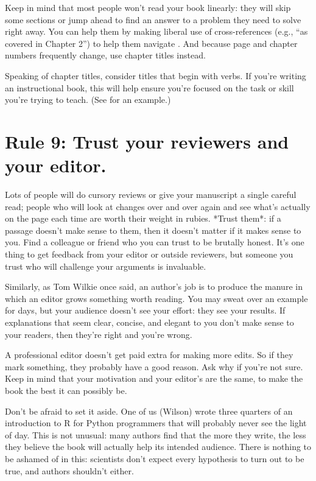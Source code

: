 \documentclass[10pt,letterpaper]{article}
\begin{document}
Keep in mind that most people won't read your book linearly:
they will skip some sections or jump ahead to find an answer to a problem they need to solve right away.
You can help them by making liberal use of cross-references
(e.g., ``as covered in Chapter 2'') to help them navigate \cite{Li2020}.
And because page and chapter numbers frequently change, use chapter titles instead.

Speaking of chapter titles, consider titles that begin with verbs.
If you're writing an instructional book,
this will help ensure you're focused on the task or skill you're trying to teach.
(See \cite{Me2022} for an example.)

\section*{Rule 9: Trust your reviewers and your editor. }

Lots of people will do cursory reviews
or give your manuscript a single careful read;
people who will look at changes over and over again
and see what's actually on the page each time
are worth their weight in rubies.
*Trust them*:
if a passage doesn't make sense to them,
then it doesn't matter if it makes sense to you.
Find a colleague or friend who you can trust to be brutally honest.
It's one thing to get feedback from your editor or outside reviewers,
but someone you trust who will challenge your arguments is invaluable.

Similarly,
as Tom Wilkie once said,
an author's job is to produce the manure in which an editor grows something worth reading.
You may sweat over an example for days,
but your audience doesn't see your effort:
they see your results.
If explanations that seem clear, concise, and elegant to you don't make sense to your readers,
then they're right and you're wrong.

A professional editor doesn't get paid extra for making more edits. So if they mark something,
they probably have a good reason. Ask why if you're not sure. Keep in mind that
your motivation and your editor's are the same, to make
the book the best it can possibly be.

Don't be afraid to set it aside. One of us (Wilson) wrote three quarters of an introduction to R for Python programmers
that will probably never see the light of day.
This is not unusual:
many authors find that the more they write,
the less they believe the book will actually help its intended audience.
There is nothing to be ashamed of in this:
scientists don't expect every hypothesis to turn out to be true,
and authors shouldn't either.
\end{document}
